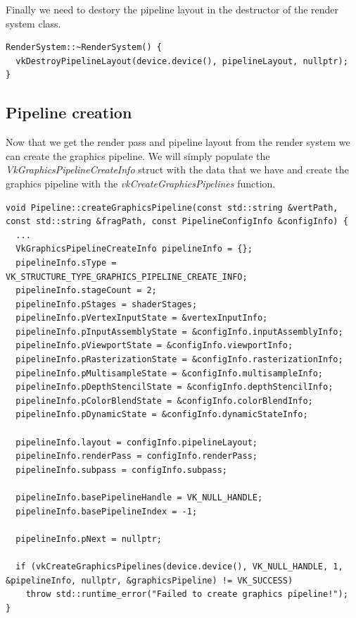 \documentclass[12pt]{report} \usepackage{preamble}
\begin{document}
Finally we need to destory the pipeline layout in the destructor of the render system class.

\begin{lstlisting}[Language=C++]
RenderSystem::~RenderSystem() {
  vkDestroyPipelineLayout(device.device(), pipelineLayout, nullptr);
}
\end{lstlisting}

\subsection{Pipeline creation}

Now that we get the render pass and pipeline layout from the render system we can create the graphics pipeline.
We will simply populate the \textit{VkGraphicsPipelineCreateInfo} struct with the data that we have and create the
graphics pipeline with the \textit{vkCreateGraphicsPipelines} function.

\begin{lstlisting}[Language=C++]
void Pipeline::createGraphicsPipeline(const std::string &vertPath, const std::string &fragPath, const PipelineConfigInfo &configInfo) {
  ...
  VkGraphicsPipelineCreateInfo pipelineInfo = {};
  pipelineInfo.sType = VK_STRUCTURE_TYPE_GRAPHICS_PIPELINE_CREATE_INFO;
  pipelineInfo.stageCount = 2;
  pipelineInfo.pStages = shaderStages;
  pipelineInfo.pVertexInputState = &vertexInputInfo;
  pipelineInfo.pInputAssemblyState = &configInfo.inputAssemblyInfo;
  pipelineInfo.pViewportState = &configInfo.viewportInfo;
  pipelineInfo.pRasterizationState = &configInfo.rasterizationInfo;
  pipelineInfo.pMultisampleState = &configInfo.multisampleInfo;
  pipelineInfo.pDepthStencilState = &configInfo.depthStencilInfo;
  pipelineInfo.pColorBlendState = &configInfo.colorBlendInfo;
  pipelineInfo.pDynamicState = &configInfo.dynamicStateInfo;

  pipelineInfo.layout = configInfo.pipelineLayout;
  pipelineInfo.renderPass = configInfo.renderPass;
  pipelineInfo.subpass = configInfo.subpass;

  pipelineInfo.basePipelineHandle = VK_NULL_HANDLE;
  pipelineInfo.basePipelineIndex = -1;

  pipelineInfo.pNext = nullptr;

  if (vkCreateGraphicsPipelines(device.device(), VK_NULL_HANDLE, 1, &pipelineInfo, nullptr, &graphicsPipeline) != VK_SUCCESS)
    throw std::runtime_error("Failed to create graphics pipeline!");
}
\end{lstlisting}
\end{document}
